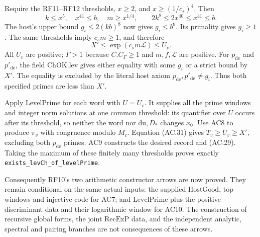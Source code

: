 Require the RF11--RF12 thresholds, $x\geq2$, and
$x\geq(1/c_s)^4$. Then
\[
 k\leq x^5,\quad x^{41}\leq b,\quad m\geq x^{1/4},
        \qquad 2k^8\leq2x^{40}\leq x^{41}\leq b.
\]
The host's upper bound $g_i\leq2(kb)^8$ now gives $g_i\leq b^9$.
Its primality gives $g_i\geq1$.
The same thresholds imply $c_s m\geq1$, and therefore
\[
              X'\leq\exp(c_s m\mathcal L)\leq U_v.
                                                               \tag{AC.31}
\]
All $U_v$ are positive; $\Gamma>1$ because $C.C_\Gamma\geq1$
and $m,f,\mathcal L$ are positive.
For $p_{\mathrm{de}}$ and $p'_{\mathrm{de}}$, the field
$\mathrm{ChOK.lev}$ gives either equality with some $g_i$ or a
strict bound by $X'$. The equality is excluded by the literal host
axiom $p_{\mathrm{de}},p'_{\mathrm{de}}\ne g_i$.
Thus both specified primes are less than $X'$.

Apply $\mathrm{LevelPrime}$ for each word with $U=U_v$.
It supplies all the prime windows and integer norm solutions at
one common threshold: its quantifier over $U$ occurs after its
threshold, so neither the word nor $\mathrm{du},D_*$ changes $x_0$.
Use AC8 to produce $\pi_v$ with congruence modulo $M_c$.
Equation (AC.31) gives $T_v\geq U_v\geq X'$, excluding both
$p_{\mathrm{de}}$ primes. AC9 constructs the desired record and
(AC.29). Taking the maximum of these finitely many thresholds
proves exactly \texttt{exists\_levCh\_of\_levelPrime}.

Consequently RF10's two arithmetic constructor arrows are now proved.
They remain conditional on the same actual inputs: the supplied
$\mathrm{HostGood}$, top windows and injective code for AC7; and
$\mathrm{LevelPrime}$ plus the positive discriminant data and their
logarithmic window for AC10. The construction of recursive global
forms, the joint $\mathrm{RecExP}$ data, and the independent analytic,
spectral and pairing branches are not consequences of these arrows.
